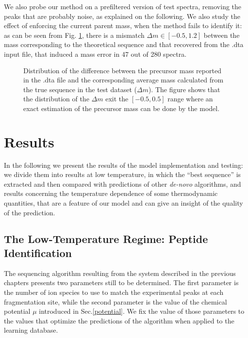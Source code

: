 We also probe our method on a prefiltered version of test spectra, removing the
peaks that are probably noise, as explained on the following.
We also study the effect of enforcing the current parent mass, when the method
fails to identify it: as can be seen from Fig. \ref{fig:test-dm}, there is a mismatch
$\Delta m\in [-0.5,1.2]$ between the mass corresponding to the theoretical
sequence and that recovered from the .dta input file, that induced a mass error
in 47 out of 280 spectra.

\begin{figure}
\begin{center}
\resizebox{0.6\textwidth}{!}{\sffamily}
\end{center}
\caption{\label{fig:test-dm} Distribution of the difference between the
precursor mass reported in the .dta file and the corresponding average mass calculated
from the true sequence in the test dataset ($\Delta m$).
The figure shows that the distribution of the $\Delta m$ exit the $[-0.5,0.5]$
range where an exact estimation of the precursor mass can be done by the model.}
\end{figure}


\section{Results}

In the following we present the results of the model implementation and
testing: we divide them into results at low temperature, in which the ``best
sequence'' is  %
extracted and then compared with  predictions of other \emph{de-novo} algorithms,
and results concerning the temperature dependence of some thermodynamic quantities, that 
are a feature of our model and
can give an insight  of %
the quality of the prediction.

\subsection{The Low-Temperature Regime: Peptide Identification}

The sequencing algorithm resulting from the system described in the previous
chapters presents two parameters still to be determined.
The first parameter is the number of ion species to use to match the
experimental peaks at each fragmentation site, while 
the second parameter is the value of the chemical potential $\mu$ introduced in
Sec.\ref{potential}.
We fix the value of those parameters to the values that optimize the predictions
of the algorithm when applied to the learning database.

